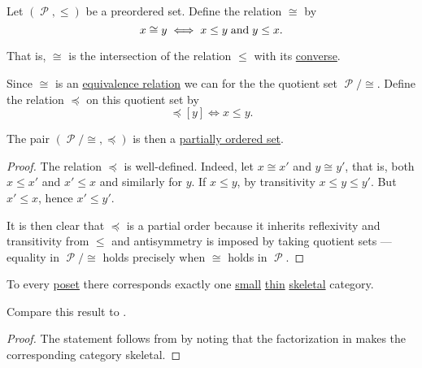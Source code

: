 \begin{proposition}\label{thm:preorder_to_partial_order}
  Let \( (\mscrP, \leq) \) be a preordered set. Define the relation \( \cong \) by
  \begin{equation*}
    x \cong y \iff x \leq y \thickspace \text{and} \thickspace y \leq x.
  \end{equation*}

  That is, \( \cong \) is the intersection of the relation \( \leq \) with its \hyperref[def:binary_relation/converse]{converse}.

  Since \( \cong \) is an \hyperref[def:equivalence_relation]{equivalence relation} we can for the the quotient set \( \mscrP / \cong \). Define the relation \( \preceq \) on this quotient set by
  \begin{equation*}
    [x] \preceq [y] \iff x \leq y.
  \end{equation*}

  The pair \( (\mscrP / \cong, \preceq) \) is then a \hyperref[def:poset]{partially ordered set}.
\end{proposition}
\begin{proof}
  The relation \( \preceq \) is well-defined. Indeed, let \( x \cong x' \) and \( y \cong y' \), that is, both \( x \leq x' \) and \( x' \leq x \) and similarly for \( y \). If \( x \leq y \), by transitivity \( x \leq y \leq y' \). But \( x' \leq x \), hence \( x' \leq y' \).

  It is then clear that \( \preceq \) is a partial order because it inherits reflexivity and transitivity from \( \leq \) and antisymmetry is imposed by taking quotient sets --- equality in \( \mscrP / \cong \) holds precisely when \( \cong \) holds in \( \mscrP \).
\end{proof}

\begin{proposition}\label{thm:partial_order_category_correspondence}
  To every \hyperref[def:poset]{poset} there corresponds exactly one \hyperref[def:category_cardinality]{small} \hyperref[def:thin_category]{thin} \hyperref[def:skeletal_category]{skeletal} category.

  Compare this result to .
\end{proposition}
\begin{proof}
  The statement follows from  by noting that the factorization in  makes the corresponding category skeletal.
\end{proof}
